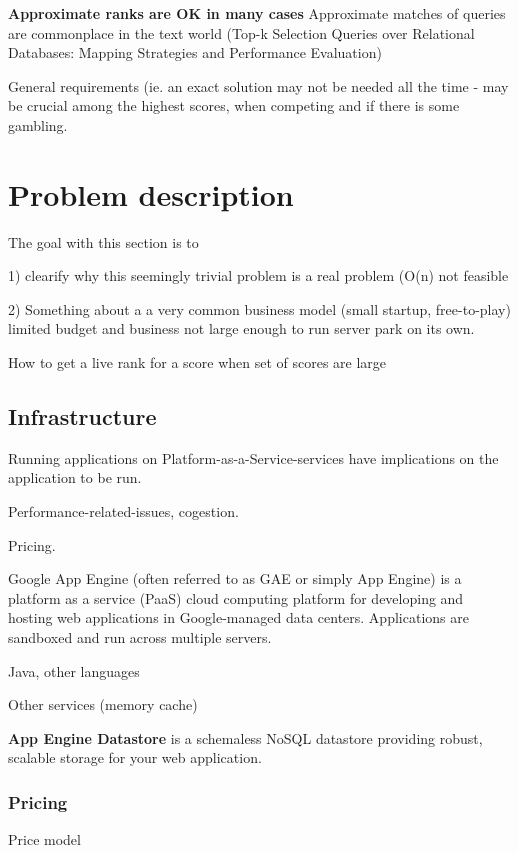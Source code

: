 \textbf{Approximate ranks are OK in many cases} Approximate matches of queries are commonplace in the text world (Top-k Selection Queries over Relational
Databases: Mapping Strategies and
Performance Evaluation)

General requirements (ie. an exact solution may not be needed all the time - may be crucial among the highest scores, when competing and if there is some gambling.
  
\section{Problem description}

\begin{shaded}The goal with this section is to

  1) clearify why this seemingly trivial problem is a real problem (O(n) \ra not feasible

  2) Something about a a very common business model (small startup, free-to-play) limited budget and business not large enough to run server park on its own. \end{shaded}

How to get a live rank for a score when set of scores are large

\subsection{Infrastructure}

\begin{shaded}
  Running applications on Platform-as-a-Service-services have implications on the application to be run.

  Performance-related-issues, cogestion.

  Pricing.

  \end{shaded}

Google App Engine (often referred to as GAE or simply App Engine) is a platform as a service (PaaS) cloud computing platform for developing and hosting web applications in Google-managed data centers. Applications are sandboxed and run across multiple servers.

Java, other languages
 
Other services (memory cache)

\textbf{App Engine Datastore} is a schemaless NoSQL datastore providing robust, scalable storage for your web application.

\subsubsection{Pricing}

Price model

